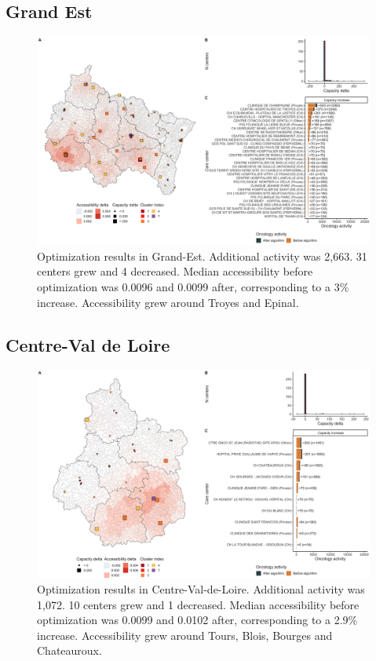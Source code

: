 \subsection*{Grand Est}

\begin{figure}[h]
    \includegraphics[width=\textwidth]{images/camion/optim_region/optim_Grand Est.png}
    \centering
    \caption{
        Optimization results in Grand-Est. Additional activity was 2,663. 31 centers grew and 4 decreased. Median accessibility before optimization was 0.0096 and 0.0099 after, corresponding to a 3\% increase. Accessibility grew around Troyes and Epinal.
    }
\end{figure}

\subsection*{Centre-Val de Loire}

\begin{figure}[h]
    \includegraphics[width=\textwidth]{images/camion/optim_region/optim_Centre-Val-de-Loire.png}
    \centering
    \caption{
        Optimization results in Centre-Val-de-Loire. Additional activity was 1,072. 10 centers grew and 1 decreased. Median accessibility before optimization was 0.0099 and 0.0102 after, corresponding to a 2.9\% increase. Accessibility grew around Tours, Blois, Bourges and Chateauroux.
    }
\end{figure}

